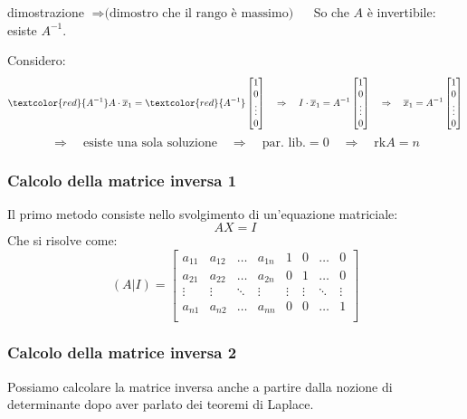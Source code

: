 \documentclass[x11names]{article}
\begin{document}
\begin{es}{dimostrazione}
$\Rightarrow \text{(dimostro che il rango è massimo)}\quad $ So che $A$ è invertibile: esiste  $A^{-1}$.

Considero:
$$
\textcolor{red}{A^{-1}} A \cdot \overline{x}_{1} = \textcolor{red}{A^{-1}}
\begin{bmatrix}
1\\ 0 \\ \vdots \\ 0 
\end{bmatrix} \quad \Rightarrow \quad 
I \cdot \overline{x}_{1} = A^{-1}
\begin{bmatrix}
 1\\ 0 \\ \vdots \\ 0 
\end{bmatrix} 
\quad \Rightarrow \quad 
\overline{x}_{1} = A^{-1}
\begin{bmatrix}
 1\\ 0 \\ \vdots \\ 0 
\end{bmatrix} 
$$
\[
\Rightarrow \quad \text{esiste una sola soluzione} \quad \Rightarrow \quad \text{par. lib.} = 0 \quad \Rightarrow \quad \text{rk}A = n
\] 	 


\end{es}



\subsubsection{Calcolo della matrice inversa 1}
Il primo metodo consiste nello svolgimento di un'equazione matriciale:
$$
AX = I
$$
Che si risolve come:
$$
(A|I) = \left[\begin{array}{cccc|cccc}
    a_{11} & a_{12} & \dots & a_{1n} & 1 & 0& \dots & 0 \\
    a_{21} & a_{22} & \dots & a_{2n} & 0 & 1& \dots & 0 \\
    \vdots & \vdots & \ddots & \vdots &  \vdots &  \vdots& \ddots & \vdots \\
    a_{n1} & a_{n2} & \dots & a_{nn} & 0 & 0& \dots & 1 \\
\end{array}\right]
$$

\subsubsection{Calcolo della matrice inversa 2}
Possiamo calcolare la matrice inversa anche a partire dalla nozione di determinante dopo aver parlato dei teoremi di Laplace.
\end{document}
